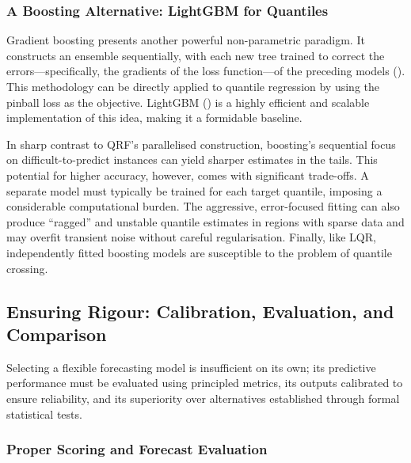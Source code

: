 \documentclass[
  a4paper,
  DIV=11,
  numbers=noendperiod]{scrreprt}
\begin{document}
\subsubsection{A Boosting Alternative: LightGBM for
Quantiles}\label{a-boosting-alternative-lightgbm-for-quantiles}

Gradient boosting presents another powerful non-parametric paradigm. It
constructs an ensemble sequentially, with each new tree trained to
correct the errors---specifically, the gradients of the loss
function---of the preceding models
(). This methodology can be
directly applied to quantile regression by using the pinball loss as the
objective. LightGBM () is a
highly efficient and scalable implementation of this idea, making it a
formidable baseline.

In sharp contrast to QRF's parallelised construction, boosting's
sequential focus on difficult-to-predict instances can yield sharper
estimates in the tails. This potential for higher accuracy, however,
comes with significant trade-offs. A separate model must typically be
trained for each target quantile, imposing a considerable computational
burden. The aggressive, error-focused fitting can also produce
``ragged'' and unstable quantile estimates in regions with sparse data
and may overfit transient noise without careful regularisation. Finally,
like LQR, independently fitted boosting models are susceptible to the
problem of quantile crossing.

\subsection{Ensuring Rigour: Calibration, Evaluation, and
Comparison}\label{ensuring-rigour-calibration-evaluation-and-comparison}

Selecting a flexible forecasting model is insufficient on its own; its
predictive performance must be evaluated using principled metrics, its
outputs calibrated to ensure reliability, and its superiority over
alternatives established through formal statistical tests.

\subsubsection{Proper Scoring and Forecast
Evaluation}\label{proper-scoring-and-forecast-evaluation}
\end{document}
